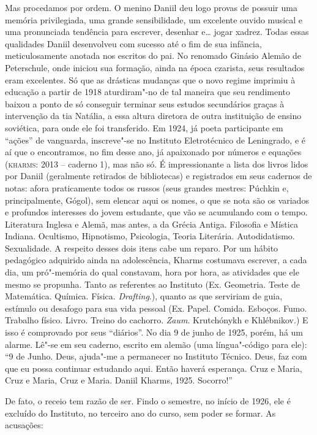 Mas procedamos por ordem. O menino Daniil deu logo provas de possuir uma
memória privilegiada, uma grande sensibilidade, um excelente ouvido
musical e uma pronunciada tendência para escrever, desenhar e\ldots{} jogar
xadrez. Todas essas qualidades Daniil desenvolveu com sucesso até o fim
de sua infância, meticulosamente anotada nos escritos do pai. No
renomado Ginásio Alemão de Peterschule, onde iniciou sua formação, ainda
na época czarista, seus resultados eram excelentes. Só que as drásticas
mudanças que o novo regime imprimiu à educação a partir de 1918
aturdiram"-no de tal maneira que seu rendimento baixou a ponto de só
conseguir terminar seus estudos secundários graças à intervenção da tia
Natália, a essa altura diretora de outra instituição de ensino
soviética, para onde ele foi transferido. Em 1924, já poeta participante
em ``ações'' de vanguarda, inscreve"-se no Instituto Eletrotécnico de
Leningrado, e é aí que o encontramos, no fim desse ano, já apaixonado
por números e equações (\textsc{kharms}: 2013 -- caderno 1), mas não só.
É impressionante a lista dos livros lidos por Daniil (geralmente
retirados de bibliotecas) e registrados em seus cadernos de notas: afora
praticamente todos os russos (seus grandes mestres: Púchkin e,
principalmente, Gógol), sem elencar aqui os nomes, o que se nota são os
variados e profundos interesses do jovem estudante, que vão se
acumulando com o tempo. Literatura Inglesa e Alemã, mas antes, a da
Grécia Antiga. Filosofia e Mística Indiana. Ocultismo, Hipnotismo,
Psicologia, Teoria Literária. Autodidatismo. Sexualidade. A respeito
desses dois itens cabe um reparo. Por um hábito pedagógico adquirido
ainda na adolescência, Kharms costumava escrever, a cada dia, um
pró"-memória do qual constavam, hora por hora, as atividades que ele
mesmo se propunha. Tanto as referentes ao Instituto (Ex. Geometria.
Teste de Matemática. Química. Física. \emph{Drafting}.), quanto as que
serviriam de guia, estímulo ou desafogo para sua vida pessoal (Ex.
Papel. Comida. Esboços. Fumo. Trabalho físico. Livro. Treino do
cachorro. \emph{Zaum}. Krutchónykh e Khlébnikov.) E isso é comprovado
por seus ``diários''. No dia 9 de junho de 1925, porém, há um alarme.
Lê"-se em seu caderno, escrito em alemão (uma língua"-código para ele):
``9 de Junho. Deus, ajuda"-me a permanecer no Instituto Técnico. Deus,
faz com que eu possa continuar estudando aqui. Então haverá esperança.
Cruz e Maria, Cruz e Maria, Cruz e Maria. Daniil Kharms, 1925.
Socorro!''

De fato, o receio tem razão de ser. Findo o semestre, no início de 1926,
ele é excluído do Instituto, no terceiro ano do curso, sem poder se
formar. As acusações:

